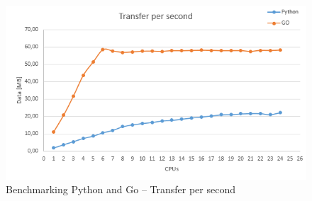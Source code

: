 \begin{figure}[htb]\centering
  \includegraphics[width=1\textwidth]{images/benchmark-transfer.png}
  \caption
    {Benchmarking Python and Go -- Transfer per second}
  \label{fig:benchmark-transfer}
\end{figure}